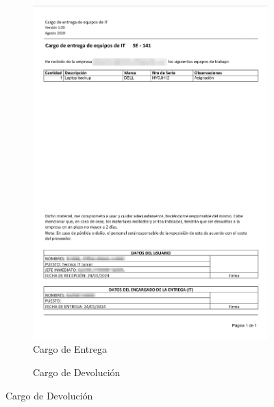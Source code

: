 \documentclass[stu, 12pt, letterpaper, donotrepeattitle, floatsintext, natbib]{apa7}
\begin{document}
\begin{figure}[h]
    \caption{IU:~Cargos de Movimientos}\label{cargos}
    \centering
    \begin{subfigure}[b]{0.3\textwidth}
        \centering
        \caption{Cargo de Entrega}\label{cargoEntrega}
        \includegraphics[width=\textwidth]{./images/reporteEntrega.png}
    \end{subfigure}
    \hfill
    \begin{subfigure}[b]{0.3\textwidth}
        \centering
        \caption{Cargo de Devolución}\label{cargoDevolucion}

\end{subfigure}
\end{figure}
\end{document}
